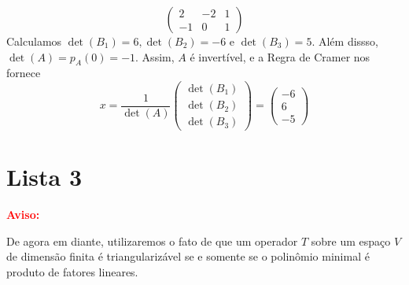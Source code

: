 \documentclass[11pt,a4paper]{article}
\begin{document}
{{\[\begin{pmatrix}
2 & -2 & 1 \\
-1 & 0 & 1
\end{pmatrix}
\]
Calculamos $\det(B_1) = 6, \det(B_2) = -6$ e $\det(B_3) = 5.$ Além dissso, $\det(A) = p_A(0) = -1.$ Assim, $A$ é invertível, e a Regra de Cramer nos fornece
\[
x = \frac{1}{\det(A)} \begin{pmatrix}
\det(B_1) \\
\det(B_2) \\
\det(B_3)
\end{pmatrix} =  \begin{pmatrix}
-6 \\
6 \\
-5
\end{pmatrix}
\]
 }
}

\newpage

\section{\textcolor{Floresta}{Lista 3}}

\noindent
\textbf{\textcolor{Red}{Aviso:}}

\medskip
\noindent
De agora em diante, utilizaremos o fato de que um operador $T$ sobre um espaço $V$ de dimensão finita é triangularizável se e somente se o polinômio minimal é produto de fatores lineares.
\end{document}

